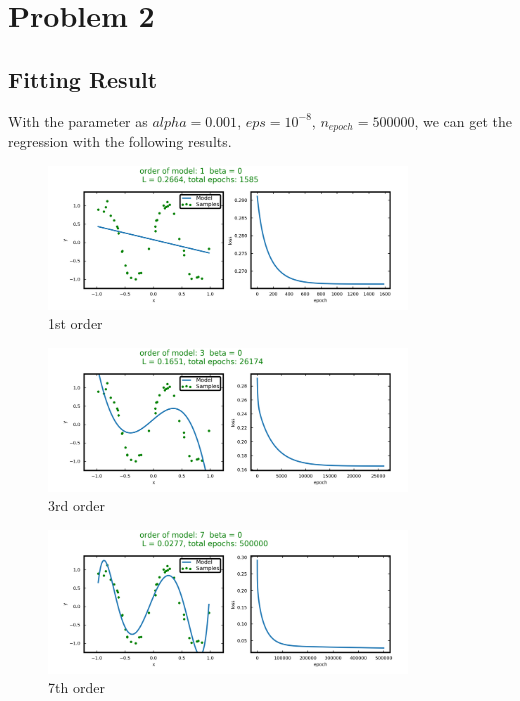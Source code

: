 \section{Problem 2}

\subsection{Fitting Result}

With the parameter as $alpha = 0.001$, $eps = 10^{-8}$, 
$n_{epoch} = 500000$, we can get the regression with the following results.

\begin{figure}[H]
\centering
  \includegraphics[width=0.85\textwidth]{fig/prob2/degree_1_beta_0_loss.png}
\centering 
\caption{1st order}
\label{fig:1st}
\end{figure}
\begin{figure}[H]
\centering
  \includegraphics[width=0.85\textwidth]{fig/prob2/degree_3_beta_0_loss.png}
\centering 
\caption{3rd order}
\label{fig:3rd}
\end{figure}
\begin{figure}[H]
\centering
  \includegraphics[width=0.85\textwidth]{fig/prob2/degree_7_beta_0_loss.png}
\centering 
\caption{7th order}
\label{fig:7th}
\end{figure}
